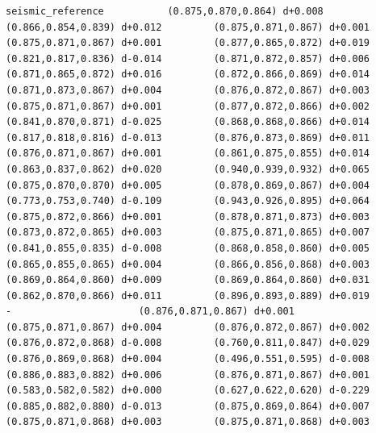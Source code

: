 \documentclass[11pt, letterpaper, openany]{book}
\begin{document}
\begin{empiricalbox}
\begin{lstlisting}[style=terminal]
seismic_reference           (0.875,0.870,0.864) d+0.008         (0.866,0.854,0.839) d+0.012         (0.875,0.871,0.867) d+0.001         (0.875,0.871,0.867) d+0.001         (0.877,0.865,0.872) d+0.019         (0.821,0.817,0.836) d-0.014         (0.871,0.872,0.857) d+0.006         (0.871,0.865,0.872) d+0.016         (0.872,0.866,0.869) d+0.014         (0.871,0.873,0.867) d+0.004         (0.876,0.872,0.867) d+0.003         (0.875,0.871,0.867) d+0.001         (0.877,0.872,0.866) d+0.002         (0.841,0.870,0.871) d-0.025         (0.868,0.868,0.866) d+0.014         (0.817,0.818,0.816) d-0.013         (0.876,0.873,0.869) d+0.011         (0.876,0.871,0.867) d+0.001         (0.861,0.875,0.855) d+0.014         (0.863,0.837,0.862) d+0.020         (0.940,0.939,0.932) d+0.065         (0.875,0.870,0.870) d+0.005         (0.878,0.869,0.867) d+0.004         (0.773,0.753,0.740) d-0.109         (0.943,0.926,0.895) d+0.064         (0.875,0.872,0.866) d+0.001         (0.878,0.871,0.873) d+0.003         (0.873,0.872,0.865) d+0.003         (0.875,0.871,0.865) d+0.007         (0.841,0.855,0.835) d-0.008         (0.868,0.858,0.860) d+0.005         (0.865,0.855,0.865) d+0.004         (0.866,0.856,0.868) d+0.003         (0.869,0.864,0.860) d+0.009         (0.869,0.864,0.860) d+0.031         (0.862,0.870,0.866) d+0.011         (0.896,0.893,0.889) d+0.019                      -                      (0.876,0.871,0.867) d+0.001         (0.875,0.871,0.867) d+0.004         (0.876,0.872,0.867) d+0.002         (0.876,0.872,0.868) d-0.008         (0.760,0.811,0.847) d+0.029         (0.876,0.869,0.868) d+0.004         (0.496,0.551,0.595) d-0.008         (0.886,0.883,0.882) d+0.006         (0.876,0.871,0.867) d+0.001         (0.583,0.582,0.582) d+0.000         (0.627,0.622,0.620) d-0.229         (0.885,0.882,0.880) d-0.013         (0.875,0.869,0.864) d+0.007         (0.875,0.871,0.868) d+0.003         (0.875,0.871,0.868) d+0.003     

\end{lstlisting}
\end{empiricalbox}
\end{document}

